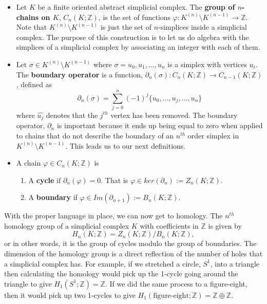 \documentclass[a4paper,12pt]{report}
\begin{document}
\begin{itemize}
\item Let $K$ be a finite oriented abstract simplicial complex. The \textbf{group of $n$-chains on $K$}, $C_n(K;\mathbb{Z})$, is the set of functions $\varphi:K^{(n)}\setminus K^{(n-1)}\rightarrow \mathbb{Z}$. Note that $K^{(n)}\setminus K^{(n-1)}$ is just the set of $n$-simplices inside a simplicial complex. The purpose of this construction is to let us do algebra with the simplices of a simplicial complex by associating an integer with each of them.
\item Let $\sigma\in K^{(n)}\setminus K^{(n-1)}$ where $\sigma = {u_0,u_1,\ldots,u_n}$ is a simplex with vertices $u_i$. The \textbf{boundary operator} is a function, $\partial_n(\sigma):C_n(K;\mathbb{Z})\rightarrow C_{n-1}(K;\mathbb{Z})$, defined as
\[
 \partial_n(\sigma) = \sum_{j=0}^{n} (-1)^j \{u_0,\ldots,\hat{u_j},\ldots,u_n\}
\]
where $\hat{u_j}$ denotes that the $j^{th}$ vertex has been removed. The boundary operator, $\partial_n$ is important because it ends up being equal to zero when applied to chains that do not describe the boundary of an $n^{th}$ order simplex in  $K^{(n)}\setminus K^{(n-1)}$. This leads us to our next definitions.
\item A chain $\varphi\in C_n(K;\mathbb{Z})$ is
\begin{enumerate}
 \item A \textbf{cycle} if $\partial_n(\varphi) = 0$. That is $\varphi\in ker(\partial_n) := Z_n(K;\mathbb{Z})$.
 \item A \textbf{boundary} if $\varphi\in Im(\partial_{n+1}):=B_n(K;\mathbb{Z})$.
\end{enumerate}
\end{itemize}
With the proper language in place, we can now get to homology. The $n^{th}$ homology group of a simplicial complex $K$ with coefficients in $\mathbb{Z}$ is given by
\[
 H_n(K;\mathbb{Z}) = Z_n(K;\mathbb{Z})/B_n(K;\mathbb{Z}),
\]
or in other words, it is the group of cycles modulo the group of boundaries. The dimension of the homology group is a direct reflection of the number of holes that a simplicial complex has. For example, if we stretched a circle, $S^1$, into a triangle then calculating the homology would pick up the 1-cycle going around the triangle to give $H_1(S^1;\mathbb{Z}) = \mathbb{Z}$. If we did the same process to a figure-eight, then it would pick up two 1-cycles to give $H_1(\textrm{figure-eight};\mathbb{Z}) = \mathbb{Z}\oplus\mathbb{Z}$.
% 
\end{document}
